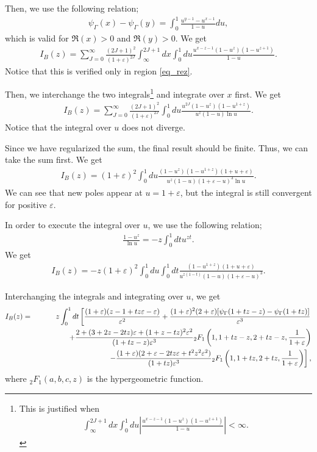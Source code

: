 \documentclass[12pt]{article}
\begin{document}
Then, we use the following relation;
\begin{align}
 \psi_{\Gamma}(x)-\psi_{\Gamma}(y) = \int_0^1\frac{u^{y-1}-u^{x-1}}{1-u}du,
\end{align}
which is valid for $\Re(x)>0$ and $\Re(y)>0$.  We get
\begin{align}
 I_B(z) = \sum_{J=0}^{\infty}\frac{(2J+1)^2}{(1+\varepsilon)^{2J}}
 \int_\infty^{2J+1}dx\int_0^1du\frac{u^{x-z-1}(1-u^z)(1-u^{z+1})}{1-u}.
\end{align}
Notice that this is verified only in region \eqref{eq_rez}.

Then, we interchange the two integrals\footnote{This is justified when
 \begin{align}
  \int_\infty^{2J+1}dx\int_0^1du
  \left|
  \frac{u^{x-z-1}(1-u^z)(1-u^{z+1})}{1-u}
  \right|<\infty.
 \end{align}}
and integrate over $x$ first. We get
\begin{align}
 I_B(z) = \sum_{J=0}^{\infty}\frac{(2J+1)^2}{(1+\varepsilon)^{2J}}
 \int_0^1du\frac{u^{2J}(1-u^z)(1-u^{1+z})}{u^z(1-u)\ln u}.
\end{align}
Notice that the integral over $u$ does not diverge.

Since we have regularized the sum, the final result should be
finite. Thus, we can take the sum first. We get
\begin{align}
 I_B(z) = (1+\varepsilon)^2\int_0^1du
 \frac{(1-u^z)(1-u^{1+z})(1+u+\varepsilon)}{u^z(1-u)(1+\varepsilon-u)^3\ln u}.
\end{align}
We can see that new poles appear at $u = 1+\varepsilon$, but the
integral is still convergent for positive $\varepsilon$.

In order to execute the integral over $u$, we use the following
relation;
\begin{align}
 \frac{1-u^z}{\ln u} = -z\int_0^1dtu^{zt}.
\end{align}
We get
\begin{align}
 I_B(z) = -z(1+\varepsilon)^2\int_0^1du\int_0^1dt
 \frac{(1-u^{1+z})(1+u+\varepsilon)}{u^{z(1-t)}(1-u)(1+\varepsilon-u)^3}.
\end{align}

Interchanging the integrals and integrating over $u$, we get
\begin{eqnarray}
 I_B(z)& = &z\int_0^1dt
 \left[
  \frac{(1+\varepsilon)(z-1+tz\varepsilon-\varepsilon)}{\varepsilon^2}
  +\frac{(1+\varepsilon)^2(2+\varepsilon)[\psi_{\Gamma}(1+tz-z)
     -\psi_{\Gamma}(1+tz)]}{\varepsilon^3}\right.\nonumber\\
  &&\hspace{10ex}+\frac{2+(3+2z-2tz)\varepsilon
   +(1+z-tz)^2\varepsilon^2}{(1+tz-z)\varepsilon^3}{}_2F_1
  \left(
   1,1+tz-z,2+tz-z,\frac{1}{1+\varepsilon}
  \right)\nonumber\\
  &&\hspace{10ex}\left.-\frac{(1+\varepsilon)
   (2+\varepsilon-2tz\varepsilon+t^2z^2\varepsilon^2)}{(1+tz)\varepsilon^3}{}_2F_1
  \left(
   1,1+tz,2+tz,\frac{1}{1+\varepsilon}
  \right)
 \right],
\end{eqnarray}
where ${}_2F_1(a,b,c,z)$ is the hypergeometric function.
\end{document}

